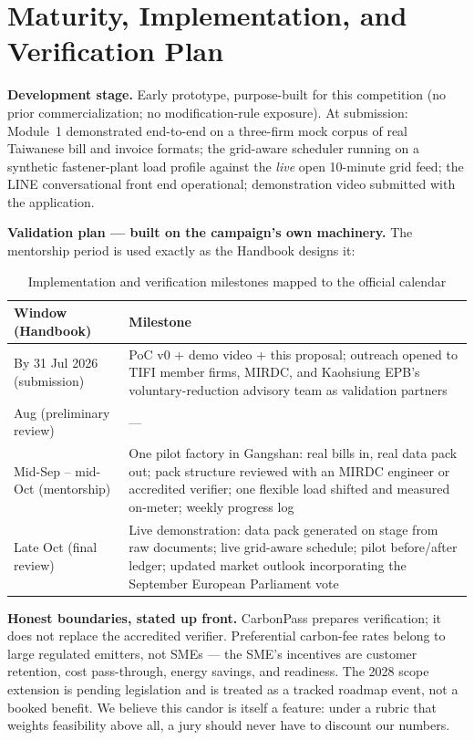 \section{Maturity, Implementation, and Verification Plan}\label{sec:maturity}

\textbf{Development stage.} Early prototype, purpose-built for this
competition (no prior commercialization; no modification-rule exposure). At
submission: Module~1 demonstrated end-to-end on a three-firm mock corpus of
real Taiwanese bill and invoice formats; the grid-aware scheduler running on a
synthetic fastener-plant load profile against the \emph{live} open 10-minute
grid feed\cite{taipowerdata}; the LINE conversational front end operational;
demonstration video submitted with the application.

\textbf{Validation plan --- built on the campaign's own machinery.} The
mentorship period is used exactly as the Handbook designs it\cite{handbook}:

\begin{table}[htbp]
\caption{Implementation and verification milestones mapped to the official calendar}
\label{tab:plan}
\small
\begin{tabularx}{\textwidth}{@{}p{}X@{}}
\toprule
\textbf{Window (Handbook)} & \textbf{Milestone} \\
\midrule
By 31 Jul 2026 (submission) & PoC v0 + demo video + this proposal; outreach opened to TIFI member firms, MIRDC, and Kaohsiung EPB's voluntary-reduction advisory team as validation partners \\
Aug (preliminary review) & --- \\
Mid-Sep -- mid-Oct (mentorship) & One pilot factory in Gangshan: real bills in, real data pack out; pack structure reviewed with an MIRDC engineer or accredited verifier; one flexible load shifted and measured on-meter; weekly progress log \\
Late Oct (final review) & Live demonstration: data pack generated on stage from raw documents; live grid-aware schedule; pilot before/after ledger; updated market outlook incorporating the September European Parliament vote\cite{akin} \\
\bottomrule
\end{tabularx}
\end{table}

\textbf{Honest boundaries, stated up front.} CarbonPass prepares verification;
it does not replace the accredited verifier\cite{omm}. Preferential carbon-fee
rates belong to large regulated emitters, not SMEs --- the SME's incentives
are customer retention, cost pass-through, energy savings, and
readiness\cite{moenvfee}. The 2028 scope extension is pending legislation and
is treated as a tracked roadmap event, not a booked benefit\cite{akin}. We
believe this candor is itself a feature: under a rubric that weights
feasibility above all\cite{handbook}, a jury should never have to discount our
numbers.

